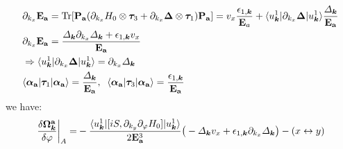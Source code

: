 \begin{subappendices}
\begin{align}
	&\partial_{k_x}\mathbf E_\mathbf a=\mbox{Tr}[\mathbf P_\mathbf a (\partial_{k_x} H_0\otimes \boldsymbol \tau_3+\partial_{k_x} \boldsymbol\Delta\otimes \boldsymbol \tau_1)\mathbf P_\mathbf a]=v_x \frac{\epsilon_{1,\bm{k}}}{\mathbf E_a}+\langle u^1_{\bm{k}}|\partial_{k_x}\boldsymbol\Delta|u^1_{\bm{k}}\rangle \frac{\varDelta_{\bm{k}}}{\mathbf E_\mathbf a}\notag\\
	&\partial_{k_x} \mathbf E_\mathbf a=\frac{\varDelta_{\bm{k}}\partial_{k_x}\varDelta_{\bm{k}}+\epsilon_{1,\bm{k}}v_x}{\mathbf E_\mathbf a}\notag\\
	&\Rightarrow \langle u^1_{\bm{k}}|\partial_{k_x}\boldsymbol\Delta|u^1_{\bm{k}}\rangle = \partial_{k_x}\varDelta_{\bm{k}}\notag\\
	&\langle\boldsymbol\alpha_{\mathbf a}|\boldsymbol\tau_1  |\boldsymbol\alpha_{\mathbf a}\rangle=\frac{\varDelta_{\bm{k}}}{\mathbf E_\mathbf a}, \;\;\langle\boldsymbol\alpha_{\mathbf a}|\boldsymbol\tau_3  |\boldsymbol\alpha_{\mathbf a}\rangle=\frac{\epsilon_{1,\bm{k}}}{\mathbf E_\mathbf a}
\end{align}
we have:
\begin{align}
	\left.\frac{\delta\boldsymbol\Omega^{\mathbf a}_{\bm{k}}}{\delta\varphi}\right|_{A}
	=&-\frac{\langle u^1_{\bm{k}}|[iS,\partial_{k_y}\partial_{\varphi}H_0]|u^1_{\bm{k}}\rangle}{2\mathbf E^3_{\mathbf a}}\big(-\varDelta_{\bm{k}} v_x+\epsilon_{1,\bm{k}}\partial_{k_x}\varDelta_{\bm{k}}\big)-(x\leftrightarrow y)\notag\\
\end{align}


\end{subappendices}
